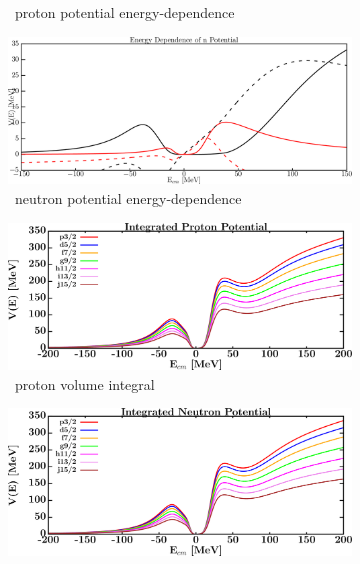 \begin{figure}[hbtp]
\begin{subfigure}[b]{0.45\textwidth}
        \caption{\oSix\ proton potential energy-dependence}
        \label{DOMFitData_o16_proton_potentialComponent_energy}
    \end{subfigure}\hspace{6pt}
    \begin{subfigure}[b]{0.45\linewidth}
        \centering
        \includegraphics[width=\linewidth]{figures/o16_neutronPotentials.png}
        \caption{\oSix\ neutron potential energy-dependence}
        \label{DOMFitData_o16_neutron_potentialComponent_energy}
    \end{subfigure}\vspace{0.3in}
    \begin{subfigure}[b]{0.45\textwidth}
        \centering
        \includegraphics[width=\linewidth]{figures/o16_protonVolumeIntegrals.png}
        \caption{\oSix\ proton volume integral}
        \label{DOMFitData_o16_proton_potentialIntegral}
    \end{subfigure}\hspace{6pt}
    \begin{subfigure}[b]{0.45\textwidth}
        \centering
        \includegraphics[width=\linewidth]{figures/o16_neutronVolumeIntegrals.png}

\end{subfigure}
\end{figure}

